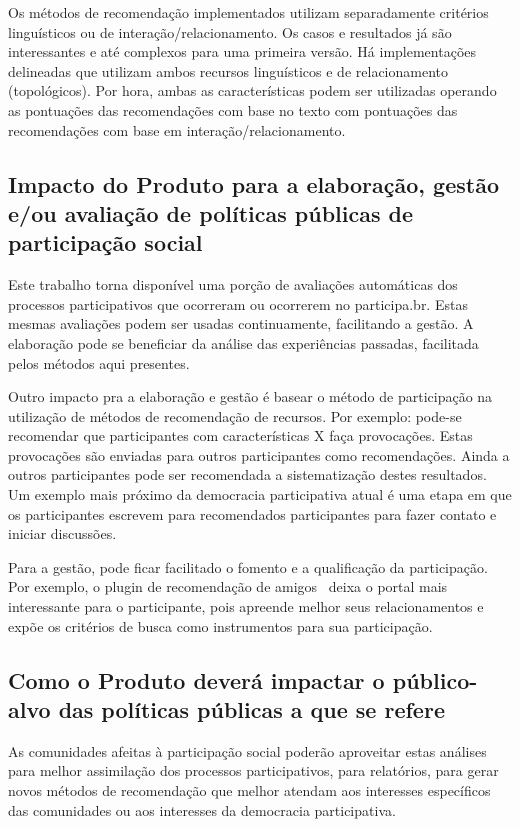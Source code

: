 \documentclass[12pt]{article}
\begin{document}
Os métodos de recomendação implementados utilizam separadamente critérios linguísticos ou de interação/relacionamento. Os casos e resultados
já são interessantes e até complexos para uma primeira versão. Há implementações delineadas 
que utilizam ambos recursos linguísticos e de relacionamento (topológicos). Por hora, ambas as características podem ser
utilizadas operando as pontuações das recomendações com base no texto com pontuações das recomendações com base em interação/relacionamento.

\subsection{Impacto do Produto para a elaboração, gestão e/ou avaliação de políticas públicas de participação social}
Este trabalho torna disponível uma porção de avaliações automáticas dos processos participativos que ocorreram ou ocorrerem no participa.br. Estas mesmas avaliações podem ser usadas continuamente, facilitando a gestão. A elaboração pode se beneficiar da análise das experiências passadas, facilitada pelos métodos aqui presentes.

Outro impacto pra a elaboração e gestão é basear o método de participação na utilização de métodos de recomendação de recursos. Por exemplo: pode-se recomendar que participantes com características X faça provocações. Estas provocações são enviadas para outros participantes como recomendações. Ainda a outros participantes pode ser recomendada a sistematização destes resultados. Um exemplo mais próximo da democracia participativa atual é uma etapa em que os participantes escrevem para recomendados participantes para fazer contato e iniciar discussões.

Para a gestão, pode ficar facilitado o fomento e a qualificação da participação. Por exemplo, o plugin de recomendação de amigos~\cite{actionItem} deixa o portal mais interessante para o participante, pois apreende melhor seus relacionamentos e expõe os critérios de busca como instrumentos para sua participação. 

\subsection{Como o Produto deverá impactar o público-alvo das políticas públicas a que se refere}
As comunidades afeitas à participação social poderão aproveitar estas análises para melhor assimilação dos processos participativos, para relatórios, para gerar novos métodos de recomendação que melhor atendam aos interesses específicos das comunidades ou aos interesses da democracia participativa.
\end{document}
